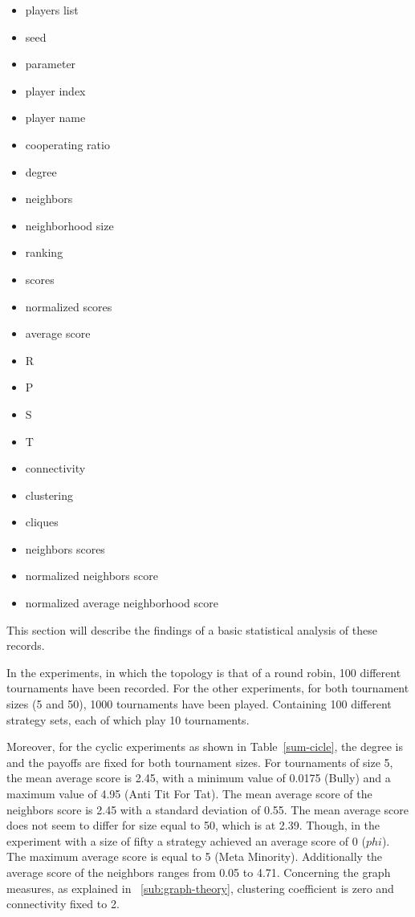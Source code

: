 \begin{multicols}{3}
	\begin{itemize}
		\item players list
		\item seed
		\item parameter
		\item player index
		\item player name
		\item cooperating ratio
		\item degree
		\item neighbors
		\item neighborhood size
		\item ranking
		\item scores
		\item normalized scores
		\item average score
		\item R
		\item P
		\item S
		\item T
		\item connectivity
		\item clustering
		\item cliques
		\item neighbors scores
		\item normalized neighbors score
		\item normalized average neighborhood score
	\end{itemize}
\end{multicols}

This section will describe the findings of a basic statistical analysis of these
records.

In the experiments, in which the topology is that of a round robin,
100 different tournaments have been recorded.
For the other experiments, for both tournament sizes (5 and 50),
1000 tournaments have been played. Containing 100 different strategy sets, each of
which play 10 tournaments.

Moreover, for the cyclic experiments as shown in Table~\ref{sum-cicle}, the degree is
and the payoffs are fixed for both tournament sizes. For tournaments of size 5,
the mean average score is 2.45, with a minimum value of 0.0175 (Bully) and a maximum
value of 4.95 (Anti Tit For Tat). The mean average score of the neighbors score
is 2.45 with a standard deviation of 0.55.
The mean average score does not seem to differ for size equal to 50, which is at
2.39. Though, in the experiment with a size of fifty a strategy
achieved an average score of 0 ($phi$). The maximum average score is equal to
5 (Meta Minority). Additionally the average score of the neighbors ranges
from 0.05 to 4.71. Concerning the graph measures, as explained in ~\autoref{sub:graph-theory},
clustering coefficient is zero and connectivity fixed to 2.

